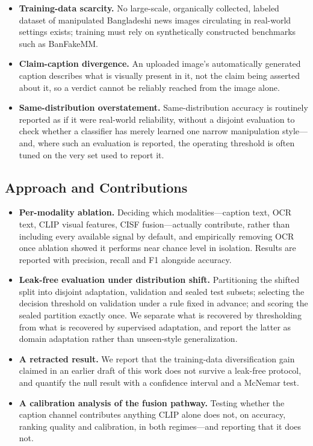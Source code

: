 \documentclass[conference,a4paper]{IEEEtran}
\begin{document}
\begin{itemize}
\item \textbf{Training-data scarcity.} No large-scale, organically collected,
labeled dataset of manipulated Bangladeshi news images circulating in
real-world settings exists; training must rely on synthetically constructed
benchmarks such as BanFakeMM.

\item \textbf{Claim-caption divergence.} An uploaded image's automatically
generated caption describes what is visually present in it, not the claim
being asserted about it, so a verdict cannot be reliably reached from the
image alone.

\item \textbf{Same-distribution overstatement.} Same-distribution accuracy is
routinely reported as if it were real-world reliability, without a disjoint
evaluation to check whether a classifier has merely learned one narrow
manipulation style---and, where such an evaluation is reported, the operating
threshold is often tuned on the very set used to report it.
\end{itemize}

\subsection{Approach and Contributions}

\begin{itemize}
\item \textbf{Per-modality ablation.} Deciding which modalities---caption
text, OCR text, CLIP visual features, CISF fusion---actually contribute,
rather than including every available signal by default, and empirically
removing OCR once ablation showed it performs near chance level in isolation.
Results are reported with precision, recall and F1 alongside accuracy.

\item \textbf{Leak-free evaluation under distribution shift.} Partitioning the
shifted split into disjoint adaptation, validation and sealed test subsets;
selecting the decision threshold on validation under a rule fixed in advance;
and scoring the sealed partition exactly once. We separate what is recovered
by thresholding from what is recovered by supervised adaptation, and report
the latter as domain adaptation rather than unseen-style generalization.

\item \textbf{A retracted result.} We report that the training-data
diversification gain claimed in an earlier draft of this work does not survive
a leak-free protocol, and quantify the null result with a confidence interval
and a McNemar test.

\item \textbf{A calibration analysis of the fusion pathway.} Testing whether
the caption channel contributes anything CLIP alone does not, on accuracy,
ranking quality and calibration, in both regimes---and reporting that it does
not.
\end{itemize}
\end{document}
